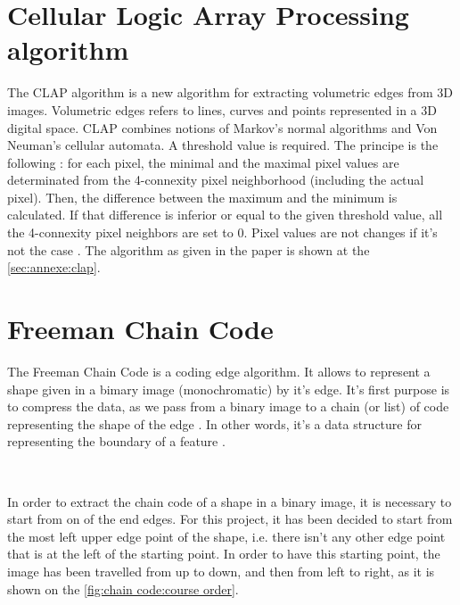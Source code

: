 \newpage 


\section[CLAP]{Cellular Logic Array Processing algorithm}

The \acrfull{CLAP} algorithm is a new algorithm for extracting volumetric edges from 3D images. Volumetric edges refers to lines, curves and points represented in a 3D digital space. \gls{CLAP} combines notions of Markov's normal algorithms and Von Neuman's cellular automata. A threshold value is required. The principe is the following : for each pixel, the minimal and the maximal pixel values are determinated from the 4-connexity pixel neighborhood (including the actual pixel). Then, the difference between the maximum and the minimum is calculated. If that difference is inferior or equal to the given  threshold value, all the 4-connexity pixel neighbors are set to 0. Pixel values are not changes if it's not the case \cite{bib:filter:EdgeWithCLAP}. The algorithm as given in the paper is shown at the \vref{sec:annexe:clap}. 







\section{Freeman Chain Code}



The Freeman Chain Code is a coding edge algorithm. It allows to represent a shape given in a bimary image (monochromatic) by it's edge. It's first purpose is to compress the data, as we pass from a binary image to a chain (or list) of code representing the shape of the edge \cite{bib:chain:ParametreGeometriqueChaineFreeman}. In other words, it's a data structure for representing the boundary of a feature \cite{bib:chain:DigitalImageProcessing}.

~~ 

In order to extract the chain code of a shape in a binary image, it is necessary to start from on of the end edges. For this project, it has been decided to start from the most left upper edge point of the shape, i.e. there isn't any other edge point that is at the left of the starting point. In order to have this starting point, the image has been travelled from up to down, and then from left to right, as it is shown on the \vref{fig:chain code:course order}.


